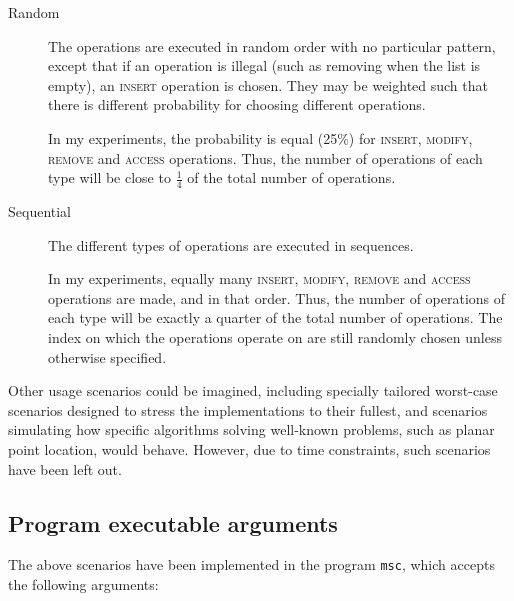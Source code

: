 \begin{description}

  \item[Random] The operations are executed in random order with no particular
  pattern, except that if an operation is illegal (such as removing when the
  list is empty), an \textsc{insert} operation is chosen. They may be weighted
  such that there is different probability for choosing different operations.

  In my experiments, the probability is equal (25\%) for \textsc{insert},
  \textsc{modify}, \textsc{remove} and \textsc{access} operations. Thus, the
  number of operations of each type will be close to $\frac{1}{4}$ of the total
  number of operations.

  \item[Sequential] The different types of operations are executed in sequences.

  In my experiments, equally many \textsc{insert}, \textsc{modify},
  \textsc{remove} and \textsc{access} operations are made, and in that order.
  Thus, the number of operations of each type will be exactly a quarter of the
  total number of operations. The index on which the operations operate on are
  still randomly chosen unless otherwise specified.

\end{description}

Other usage scenarios could be imagined, including specially tailored worst-case
scenarios designed to stress the implementations to their fullest, and scenarios
simulating how specific algorithms solving well-known problems, such as planar
point location, would behave. However, due to time constraints, such scenarios
have been left out.

\subsection{Program executable arguments}

The above scenarios have been implemented in the program \texttt{msc}, which
accepts the following arguments:

